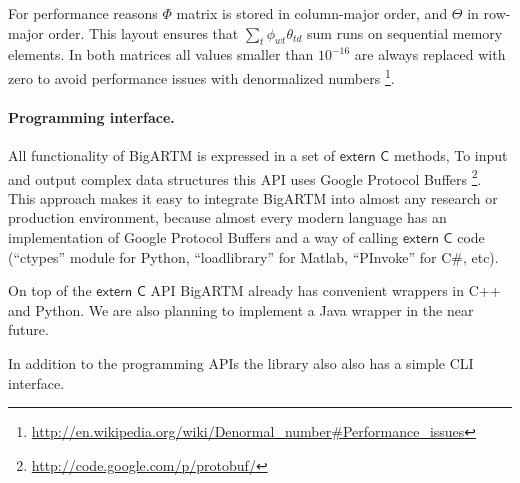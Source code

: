 \documentclass{llncs}
\newcommand{\kw}[1]{\textsf{#1}}
\begin{document}
For performance reasons $\Phi$ matrix is stored in column-major order, and $\Theta$ in row-major order.
This layout ensures that $\sum_t \phi_{wt} \theta_{td}$ sum runs on sequential memory elements.
In both matrices all values smaller than $10^{-16}$ are always replaced with zero to avoid performance issues with denormalized numbers
\footnote{\url{http://en.wikipedia.org/wiki/Denormal_number#Performance_issues}}.

\paragraph{Programming interface.}
All functionality of BigARTM is expressed in a set of $\kw{extern C}$ methods,
To input and output complex data structures this API uses Google Protocol Buffers
\footnote{\url{http://code.google.com/p/protobuf/}}.
This approach makes it easy to integrate BigARTM into almost any research or production environment,
because almost every modern language has an implementation of Google Protocol Buffers
and a way of calling $\kw{extern C}$ code
(``ctypes'' module for Python, ``loadlibrary'' for Matlab, ``PInvoke'' for C\#, etc).

On top of the $\kw{extern C}$ API BigARTM already has convenient wrappers in C++ and Python.
We are also planning to implement a Java wrapper in the near future.

In addition to the programming APIs the library also also has a simple CLI interface.
\end{document}
